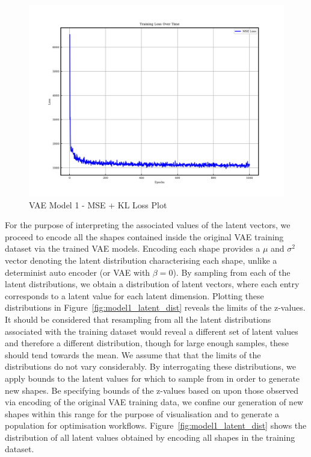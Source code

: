 \documentclass{article}
\begin{document}
\begin{figure}[H]
\centering
    \includegraphics[width=0.75\linewidth]{figures/VAEmodels/model1/loss_plot.png}
    \caption{VAE Model 1 - MSE + KL Loss Plot}
    \label{fig:model1_loss_plot}
\end{figure}
For the purpose of interpreting the associated values of the latent vectors, we proceed to encode all the shapes contained inside the original VAE training dataset via the trained VAE models. Encoding each shape provides a $\mu$ and $\sigma^2$ vector denoting the latent distribution characterising each shape, unlike a determinist auto encoder (or VAE with $\beta=0$). By sampling from each of the latent distributions, we obtain a distribution of latent vectors, where each entry corresponds to a latent value for each latent dimension.  Plotting these distributions in Figure~\ref{fig:model1_latent_dist} reveals the limits of the z-values. It should be considered that  resampling from all the latent distributions associated with the training dataset would reveal a different set of latent values and therefore a different distribution, though for large enough samples, these should tend towards the mean. We assume that that the limits of the distributions do not vary considerably. By interrogating these distributions, we apply bounds to the latent values for which to sample from in order to generate new shapes. Be specifying bounds of the z-values based on upon those observed via encoding of the original VAE training data, we confine our generation of new shapes within this range for the purpose of visualisation and to generate a population for optimisation workflows. Figure~\ref{fig:model1_latent_dist} shows the distribution of all latent values obtained by encoding all shapes in the training dataset.
\end{document}
